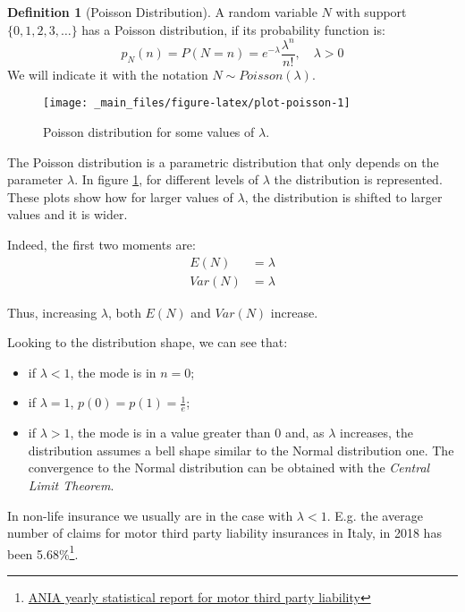 \documentclass[a4paper, nobind]{templates/ociamthesis}
\providecommand{\tightlist}{%
  \setlength{\itemsep}{0pt}\setlength{\parskip}{0pt}}
\theoremstyle{definition}
\newtheorem{definition}{Definition}[chapter]
\theoremstyle{definition}
\theoremstyle{definition}
\theoremstyle{remark}
\begin{document}
\begin{definition}[Poisson Distribution]
\label{def:def-poisson} \iffalse (Poisson Distribution) \fi{} A random variable \(N\) with support \(\{0,1,2,3,\dots \}\) has a Poisson distribution, if its probability function is:
\[
p_N(n) = P\left( N = n \right) = e^{-\lambda}\frac{\lambda^n}{n!}, \quad \lambda>0
\]
We will indicate it with the notation \(N \sim Poisson(\lambda)\).
\end{definition}

\begin{figure}[!hbtp]

{\centering \texttt{[image: \_main\_files/figure-latex/plot-poisson-1]} 

}

\caption{Poisson distribution for some values of $\lambda$.}\label{fig:plot-poisson}
\end{figure}

The Poisson distribution is a parametric distribution that only depends on the parameter \(\lambda\). In figure \ref{fig:plot-poisson}, for different levels of \(\lambda\) the distribution is represented. These plots show how for larger values of \(\lambda\), the distribution is shifted to larger values and it is wider.

Indeed, the first two moments are:
\begin{align*}
E(N)   & = \lambda \\
Var(N) & = \lambda
\end{align*}

Thus, increasing \(\lambda\), both \(E(N)\) and \(Var(N)\) increase.

Looking to the distribution shape, we can see that:

\begin{itemize}
\tightlist
\item
  if \(\lambda<1\), the mode is in \(n=0\);
\item
  if \(\lambda=1\), \(p(0)=p(1)=\frac{1}{e}\);
\item
  if \(\lambda>1\), the mode is in a value greater than \(0\) and, as \(\lambda\) increases, the distribution assumes a bell shape similar to the Normal distribution one. The convergence to the Normal distribution can be obtained with the \emph{Central Limit Theorem}.
\end{itemize}

In non-life insurance we usually are in the case with \(\lambda<1\). E.g. the average number of claims for motor third party liability insurances in Italy, in 2018 has been 5.68\%\footnote{\href{https://www.ania.it/ricerca-avanzata/-/asset_publisher/XIyLeujL9irt/content/id/113283}{ANIA yearly statistical report for motor third party liability}}.
\end{document}
